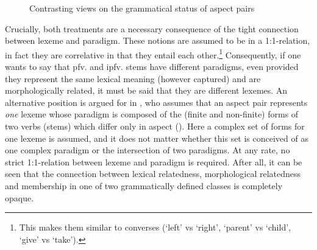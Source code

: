 \documentclass[output=paper]{langscibook}
\begin{document}
\begin{figure}
\caption{Contrasting views on the grammatical status of aspect pairs}
\label{fig:wiemer:4}
\end{figure}

Crucially, both treatments are a necessary consequence of the tight connection between lexeme and paradigm. These notions are assumed to be in a 1:1-relation, in fact they are correlative in that they entail each other.\footnote{This makes them similar to converses (‘left’ vs ‘right’, ‘parent’ vs ‘child’, ‘give’ vs ‘take’).} Consequently, if one wants to say that pfv. and ipfv. stems have different paradigms, even provided they represent the same lexical meaning (however captured) and are morphologically related, it must be said that they are different lexemes. An alternative position is argued for in \citet{Breu1984b,Breu1984}, who assumes that an aspect pair represents \emph{one} lexeme whose paradigm is composed of the (finite and non-finite) forms of two verbs (stems) which differ only in aspect (\citeyear[128–129]{Breu1984}). Here a complex set of forms for one lexeme is assumed, and it does not matter whether this set is conceived of as one complex paradigm or the intersection of two paradigms. At any rate, no strict 1:1-relation between lexeme and paradigm is required. After all, it can be seen that the connection between lexical relatedness, morphological relatedness and membership in one of two grammatically defined classes is completely opaque.
\end{document}
